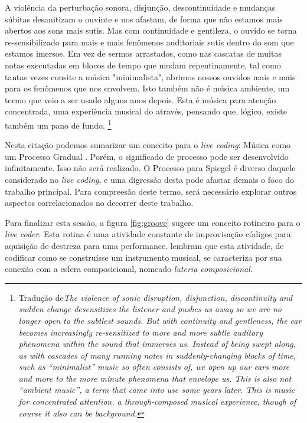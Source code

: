 \begin{citacao}
 A violência da perturbação sonora, disjunção, descontinuidade e mudanças súbitas desanitizam o ouvinte e nos afastam, de forma que não estamos mais abertos aos sons mais sutis. Mas com continuidade e gentileza, o ouvido se torna re-sensibilizado para mais e mais fenômenos auditoriais sutis dentro do som que estamos imersos. Em vez de sermos arrastados, como nas cascatas de muitas notas executadas em blocos de tempo que mudam repentinamente, tal como tantas vezes consite a música "minimalista", abrimos nossos ouvidos mais e mais para os fenômenos que nos envolvem. Isto também não é música ambiente, um termo que veio a ser usado alguns anos depois. Esta é música para atenção concentrada, uma experiência musical do através, pensando que, lógico, existe também um pano de fundo. \footnote{Tradução de\emph{The violence of sonic disruption, disjunction, discontinuity and sudden change desensitizes the listener and pushes us away so we are no longer open to the subtlest sounds. But with continuity and gentleness, the ear becomes increasingly re-sensitized to more and more subtle auditory phenomena within the sound that immerses us. Instead of being swept along, as with cascades of many running notes in suddenly-changing blocks of time, such as “minimalist” music so often consists of, we open up our ears more and more to the more minute phenomena that envelope us. This is also not “ambient music”, a term that came into use some years later. This is music for concentrated attention, a through-composed musical experience, though of course it also can be background.}}
\end{citacao}

Nesta citação podemos sumarizar um conceito para o \emph{live coding}: Música como um Processo Gradual . Porém, o significado de processo pode ser desenvolvido infinitamente. Isso não será realizado. O Processo para Spiegel é diverso daquele considerado no \emph{live coding}, e uma digressão desta pode afastar demais o foco do trabalho principal. Para compreesão deste termo, será necessário explorar outros aspectos correlacionados no decorrer deste trabalho.

Para finalizar esta sessão, a figura \autoref{fig:groove} sugere um conceito rotineiro para o \emph{live coder}. Esta rotina é uma atividade constante de improvisação códigos para aquisição de destreza para uma performance.  lembram que esta atividade, de codificar como se construísse um instrumento musical, se caracteriza por sua conexão com a esfera composicional, nomeado \emph{luteria composicional}.

